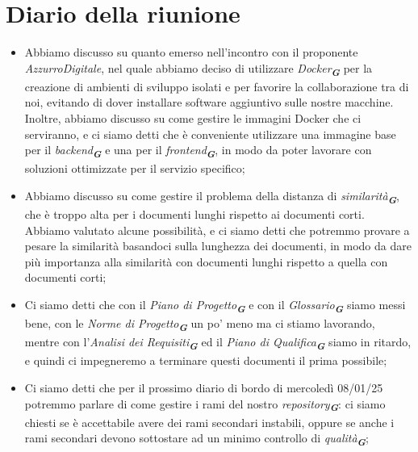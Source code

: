
\section{Diario della riunione}

\begin{itemize}
    \item Abbiamo discusso su quanto emerso nell'incontro con il proponente \emph{AzzurroDigitale}, nel quale abbiamo deciso di
    utilizzare \emph{Docker}\textsubscript{\textit{\textbf{G}}} per la creazione di ambienti di sviluppo isolati e per favorire
    la collaborazione tra di noi, evitando di dover installare software aggiuntivo sulle nostre macchine. Inoltre, abbiamo discusso
    su come gestire le immagini Docker che ci serviranno, e ci siamo detti che è conveniente utilizzare una immagine base per il
    \emph{backend}\textsubscript{\textit{\textbf{G}}} e una per il \emph{frontend}\textsubscript{\textit{\textbf{G}}}, in modo da 
    poter lavorare con soluzioni ottimizzate per il servizio specifico;
    \item Abbiamo discusso su come gestire il problema della distanza di \emph{similarità}\textsubscript{\textit{\textbf{G}}}, che 
    è troppo alta per i documenti lunghi rispetto ai documenti corti. Abbiamo valutato alcune possibilità, e ci siamo detti che
    potremmo provare a pesare la similarità basandoci sulla lunghezza dei documenti, in modo da dare più importanza alla similarità
    con documenti lunghi rispetto a quella con documenti corti;
    \item Ci siamo detti che con il \emph{Piano di Progetto}\textsubscript{\textit{\textbf{G}}} e con il \emph{Glossario}\textsubscript{\textit{\textbf{G}}}
    siamo messi bene, con le \emph{Norme di Progetto}\textsubscript{\textit{\textbf{G}}} un po' meno  ma ci stiamo lavorando, mentre 
    con l'\emph{Analisi dei Requisiti}\textsubscript{\textit{\textbf{G}}} ed il \emph{Piano di Qualifica}\textsubscript{\textit{\textbf{G}}} 
    siamo in ritardo, e quindi ci impegneremo a terminare questi documenti il prima possibile;
    \item Ci siamo detti che per il prossimo diario di bordo di mercoledì 08/01/25 potremmo parlare di come gestire i rami
    del nostro \emph{repository}\textsubscript{\textit{\textbf{G}}}: ci siamo chiesti se è accettabile avere dei rami secondari instabili,
    oppure se anche i rami secondari devono sottostare ad un minimo controllo di \emph{qualità}\textsubscript{\textit{\textbf{G}}};

\end{itemize}
